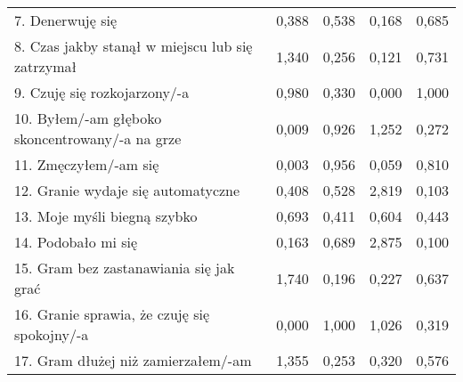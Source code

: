 \begin{table}[!h]
\begin{center}
\begin{tabular}{|m{10em}|m{5em}|m{5em}|m{5em}|m{5em}|}
            7. Denerwuję się                                                  & 0,388                             & 0,538                  & 0,168                         & 0,685              \\
            8. Czas jakby stanął w miejscu lub się zatrzymał                  & 1,340                             & 0,256                  & 0,121                         & 0,731              \\
            9. Czuję się \newline rozkojarzony/-a                             & 0,980                             & 0,330                  & 0,000                         & 1,000              \\
            10. Byłem/-am głęboko \newline skoncentrowany/-a \newline na grze & 0,009                             & 0,926                  & 1,252                         & 0,272              \\
            11. Zmęczyłem/-am się                                             & 0,003                             & 0,956                  & 0,059                         & 0,810              \\
            12. Granie wydaje się automatyczne                                & 0,408                             & 0,528                  & 2,819                         & 0,103              \\
            13. Moje myśli \newline biegną szybko                             & 0,693                             & 0,411                  & 0,604                         & 0,443              \\
            14. Podobało mi się                                               & 0,163                             & 0,689                  & 2,875                         & 0,100              \\
            15. Gram bez zastanawiania się jak grać                           & 1,740                             & 0,196                  & 0,227                         & 0,637              \\
            16. Granie sprawia, \newline że czuję się spokojny/-a             & 0,000                             & 1,000                  & 1,026                         & 0,319              \\
            17. Gram dłużej \newline niż zamierzałem/-am                      & 1,355                             & 0,253                  & 0,320                         & 0,576              \\

\end{tabular}
\end{center}
\end{table}
